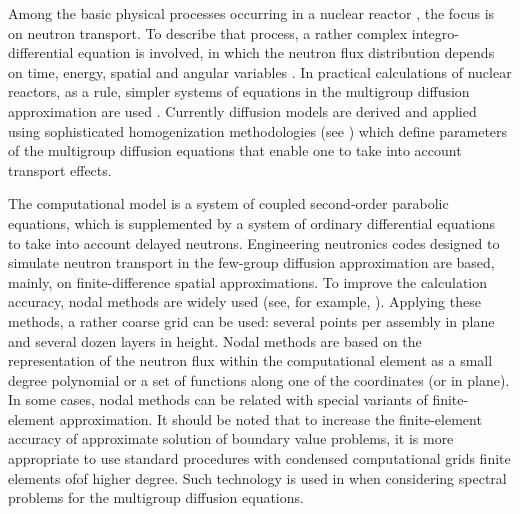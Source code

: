 \documentclass[authoryear]{elsarticle}
\begin{document}
Among the basic physical processes occurring in a nuclear reactor  \citep{duderstadt1976nuclear}, 
the focus is on neutron transport. To describe that process, a rather complex integro-differential equation is involved, in which the neutron flux distribution depends on time, energy, spatial and angular variables  \citep{hetrick1971dynamics,stacey}. 
In practical calculations of nuclear reactors, as a rule,  simpler systems of equations in the multigroup diffusion  approximation  are used  \citep{marchuk1986numerical,lewis1993computational,sutton1996diffusion,cho2005fundamentals}.
Currently diffusion models are derived and applied using sophisticated homogenization methodologies (see \cite{sanchez2009assembly,dugan2016cross}) 
which define parameters of the multigroup diffusion equations that enable one to take into account transport effects. 

The computational model is a system of coupled second-order parabolic equations, which is supplemented by a system of ordinary differential equations to take into account delayed neutrons. Engineering neutronics codes designed to simulate neutron transport in the few-group diffusion approximation are based, mainly, on finite-difference spatial approximations. To improve the calculation accuracy, nodal methods are widely used (see, for example, \cite{smith1979analytic,lawrence1986progress}). 
Applying these methods, a rather coarse grid can be used: several points per assembly in plane and several dozen layers in height. Nodal methods are based on the representation of the neutron flux within the computational element as a small degree polynomial or a set of functions along one of the coordinates (or in plane). In some cases, nodal methods can be related  \citep{grossman2007nodal} with special variants of finite-element approximation. It should be noted that to increase the finite-element accuracy of approximate solution of boundary value problems, it is more appropriate to use standard procedures with condensed  computational grids finite elements ofof higher degree. Such technology is used in  \cite{vidal2014solution,avvakumov2017spectral} 
when considering spectral problems for the multigroup diffusion equations.
\end{document}
